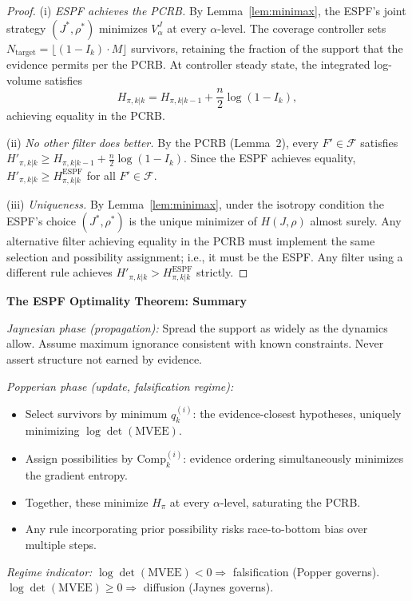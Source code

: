 \documentclass[12pt]{article}
\begin{document}
\begin{proof}
(i) \textit{ESPF achieves the PCRB.} By Lemma~\ref{lem:minimax}, the ESPF's joint strategy $(J^*,\rho^*)$ minimizes $V^J_\alpha$ at every $\alpha$-level. The coverage controller sets $N_{\mathrm{target}} = \lfloor(1-I_k)\cdot M\rfloor$ survivors, retaining the fraction of the support that the evidence permits per the PCRB. At controller steady state, the integrated log-volume satisfies
\[
H_{\pi,k|k} = H_{\pi,k|k-1} + \frac{n}{2}\log(1 - I_k),
\]
achieving equality in the PCRB.

(ii) \textit{No other filter does better.} By the PCRB (Lemma~2), every $F' \in \mathcal{F}$ satisfies $H'_{\pi,k|k} \geq H_{\pi,k|k-1} + \frac{n}{2}\log(1-I_k)$. Since the ESPF achieves equality, $H'_{\pi,k|k} \geq H^{\mathrm{ESPF}}_{\pi,k|k}$ for all $F' \in \mathcal{F}$.

(iii) \textit{Uniqueness.} By Lemma~\ref{lem:minimax}, under the isotropy condition the ESPF's choice $(J^*,\rho^*)$ is the unique minimizer of $H(J,\rho)$ almost surely. Any alternative filter achieving equality in the PCRB must implement the same selection and possibility assignment; i.e., it must be the ESPF. Any filter using a different rule achieves $H'_{\pi,k|k} > H^{\mathrm{ESPF}}_{\pi,k|k}$ strictly.
\end{proof}

\bigskip
\noindent\textbf{The ESPF Optimality Theorem: Summary}

\medskip
\noindent\textit{Jaynesian phase (propagation):} Spread the support as widely as the dynamics allow. Assume maximum ignorance consistent with known constraints. Never assert structure not earned by evidence.

\medskip
\noindent\textit{Popperian phase (update, falsification regime):}
\begin{itemize}
\item Select survivors by minimum $q^{(i)}_k$: the evidence-closest hypotheses, uniquely minimizing $\log\det(\mathrm{MVEE})$.
\item Assign possibilities by $\mathrm{Comp}^{(i)}_k$: evidence ordering simultaneously minimizes the gradient entropy.
\item Together, these minimize $H_\pi$ at every $\alpha$-level, saturating the PCRB.
\item Any rule incorporating prior possibility risks race-to-bottom bias over multiple steps.
\end{itemize}

\noindent\textit{Regime indicator:} $\log\det(\mathrm{MVEE}) < 0 \Rightarrow$ falsification (Popper governs). $\log\det(\mathrm{MVEE}) \geq 0 \Rightarrow$ diffusion (Jaynes governs).
\end{document}
